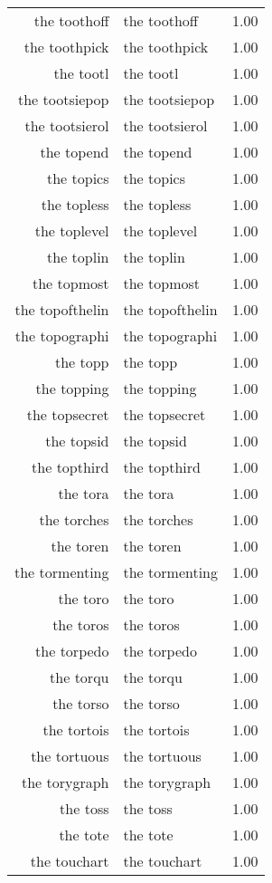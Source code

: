 \begin{table}[ht]
\begin{tabular}{rlr}
  the toothoff & the toothoff & 1.00 \\ 
  the toothpick & the toothpick & 1.00 \\ 
  the tootl & the tootl & 1.00 \\ 
  the tootsiepop & the tootsiepop & 1.00 \\ 
  the tootsierol & the tootsierol & 1.00 \\ 
  the topend & the topend & 1.00 \\ 
  the topics & the topics & 1.00 \\ 
  the topless & the topless & 1.00 \\ 
  the toplevel & the toplevel & 1.00 \\ 
  the toplin & the toplin & 1.00 \\ 
  the topmost & the topmost & 1.00 \\ 
  the topofthelin & the topofthelin & 1.00 \\ 
  the topographi & the topographi & 1.00 \\ 
  the topp & the topp & 1.00 \\ 
  the topping & the topping & 1.00 \\ 
  the topsecret & the topsecret & 1.00 \\ 
  the topsid & the topsid & 1.00 \\ 
  the topthird & the topthird & 1.00 \\ 
  the tora & the tora & 1.00 \\ 
  the torches & the torches & 1.00 \\ 
  the toren & the toren & 1.00 \\ 
  the tormenting & the tormenting & 1.00 \\ 
  the toro & the toro & 1.00 \\ 
  the toros & the toros & 1.00 \\ 
  the torpedo & the torpedo & 1.00 \\ 
  the torqu & the torqu & 1.00 \\ 
  the torso & the torso & 1.00 \\ 
  the tortois & the tortois & 1.00 \\ 
  the tortuous & the tortuous & 1.00 \\ 
  the torygraph & the torygraph & 1.00 \\ 
  the toss & the toss & 1.00 \\ 
  the tote & the tote & 1.00 \\ 
  the touchart & the touchart & 1.00 \\ 

\end{tabular}
\end{table}
